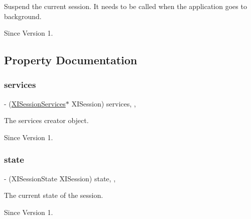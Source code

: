 Suspend the current session. It needs to be called when the application goes to background. 

\begin{DoxySince}{Since}
Version 1. 
\end{DoxySince}


\subsection{Property Documentation}
\hypertarget{protocol_x_i_session_01-p_ab01a51f9111d2b2a172d2993e3cdaf55}{}\label{protocol_x_i_session_01-p_ab01a51f9111d2b2a172d2993e3cdaf55} 
\subsubsection{\texorpdfstring{services}{services}}
{\footnotesize\ttfamily -\/ (\hyperlink{interface_x_i_session_services}{X\+I\+Session\+Services}$\ast$ X\+I\+Session) services\hspace{0.3cm}{\ttfamily [read]}, {\ttfamily [nonatomic]}, {\ttfamily [assign]}}



The services creator object. 

\begin{DoxySince}{Since}
Version 1. 
\end{DoxySince}
\hypertarget{protocol_x_i_session_01-p_a2bf3bb210d784bc62f51b321487d237a}{}\label{protocol_x_i_session_01-p_a2bf3bb210d784bc62f51b321487d237a} 
\subsubsection{\texorpdfstring{state}{state}}
{\footnotesize\ttfamily -\/ (X\+I\+Session\+State X\+I\+Session) state\hspace{0.3cm}{\ttfamily [read]}, {\ttfamily [nonatomic]}, {\ttfamily [assign]}}



The current state of the session. 

\begin{DoxySince}{Since}
Version 1. 
\end{DoxySince}
\hypertarget{protocol_x_i_session_01-p_ac0fba6335bebf860a1bc5ba90d972944}{}\label{protocol_x_i_session_01-p_ac0fba6335bebf860a1bc5ba90d972944} 
